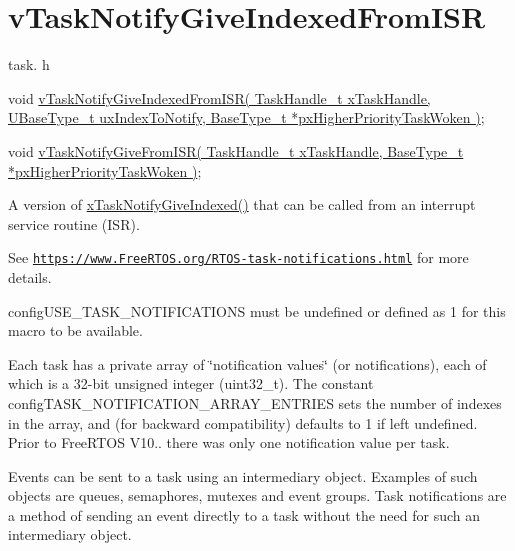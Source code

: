 \hypertarget{group__v_task_notify_give_indexed_from_i_s_r}{}\section{v\+Task\+Notify\+Give\+Indexed\+From\+I\+SR}
\label{group__v_task_notify_give_indexed_from_i_s_r}
task. h 
\begin{DoxyPre}void \hyperlink{externals_2freertos_2include_2task_8h_a756fe3c4656aaaa8ef6d309e0078e132}{vTaskNotifyGiveIndexedFromISR( TaskHandle\_t xTaskHandle, UBaseType\_t uxIndexToNotify, BaseType\_t *pxHigherPriorityTaskWoken )};\end{DoxyPre}
 
\begin{DoxyPre}void \hyperlink{externals_2freertos_2include_2task_8h_a1add9ef24d3763e34603b18802fae9d7}{vTaskNotifyGiveFromISR( TaskHandle\_t xTaskHandle, BaseType\_t *pxHigherPriorityTaskWoken )};\end{DoxyPre}


A version of \hyperlink{externals_2freertos_2include_2task_8h_a53ec0c8b6b8281a3055747813570193c}{x\+Task\+Notify\+Give\+Indexed()} that can be called from an interrupt service routine (I\+SR).

See \href{https://www.FreeRTOS.org/RTOS-task-notifications.html}{\tt https\+://www.\+Free\+R\+T\+O\+S.\+org/\+R\+T\+O\+S-\/task-\/notifications.\+html} for more details.

config\+U\+S\+E\+\_\+\+T\+A\+S\+K\+\_\+\+N\+O\+T\+I\+F\+I\+C\+A\+T\+I\+O\+NS must be undefined or defined as 1 for this macro to be available.

Each task has a private array of \char`\"{}notification values\char`\"{} (or \textquotesingle{}notifications\textquotesingle{}), each of which is a 32-\/bit unsigned integer (uint32\+\_\+t). The constant config\+T\+A\+S\+K\+\_\+\+N\+O\+T\+I\+F\+I\+C\+A\+T\+I\+O\+N\+\_\+\+A\+R\+R\+A\+Y\+\_\+\+E\+N\+T\+R\+I\+ES sets the number of indexes in the array, and (for backward compatibility) defaults to 1 if left undefined. Prior to Free\+R\+T\+OS V10.. there was only one notification value per task.

Events can be sent to a task using an intermediary object. Examples of such objects are queues, semaphores, mutexes and event groups. Task notifications are a method of sending an event directly to a task without the need for such an intermediary object.

